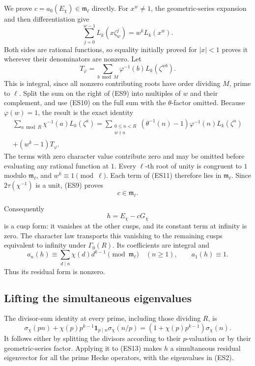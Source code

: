 We prove \(c=a_0(E_\chi)\in\mathfrak m_\ell\) directly.
For \(x^w\ne1\), the geometric-series expansion and then
differentiation give
\[
             \sum_{j=0}^{w-1}L_k(x\zeta_w^j)
                                       =w^kL_k(x^w).
 \tag{ES10}
\]
Both sides are rational functions, so equality initially
proved for \(|x|<1\) proves it wherever their denominators
are nonzero.
Let
\[
          T_\varphi=\sum_{b\bmod M}
                         \varphi^{-1}(b)L_k(\zeta^{wb}).
\]
This is integral, since all nonzero contributing roots have
order dividing \(M\), prime to \(\ell\).
Split the sum on the right of (ES9) into multiples of \(w\)
and their complement, and use (ES10) on the full sum with
the \(\theta\)-factor omitted.
Because \(\varphi(w)=1\), the result is the exact identity
\[
 \begin{split}
 \sum_{a\bmod R}\chi^{-1}(a)L_k(\zeta^a)
  =\sum_{\substack{0\le n<R\\w\nmid n}}
        (\theta^{-1}(n)-1)\varphi^{-1}(n)L_k(\zeta^n)\\
                 +(w^k-1)T_\varphi .
 \end{split}
 \tag{ES11}
\]
The terms with zero character value contribute zero and may
be omitted before evaluating any rational function at \(1\).
Every \(\ell\)-th root of unity is congruent to \(1\) modulo
\(\mathfrak m_\ell\), and \(w^k\equiv1\pmod\ell\).
Each term of (ES11) therefore lies in
\(\mathfrak m_\ell\).
Since \(2\tau(\chi^{-1})\) is a unit, (ES9) proves
\[
                               c\in\mathfrak m_\ell .
 \tag{ES12}
\]

Consequently
\[
                             h=E_\chi-cG_\chi
\]
is a cusp form: it vanishes at the other cusps, and its
constant term at infinity is zero.
The character law transports this vanishing to the remaining
cusps equivalent to infinity under \(\Gamma_0(R)\).
Its coefficients are integral and
\[
 a_n(h)\equiv\sum_{d\mid n}\chi(d)d^{k-1}
                    \pmod{\mathfrak m_\ell}\quad(n\ge1),
                   \qquad a_1(h)\equiv1 .
 \tag{ES13}
\]
Thus its residual form is nonzero.

\subsection{Lifting the simultaneous eigenvalues}
The divisor-sum identity at every prime, including those
dividing \(R\), is
\[
 \sigma_\chi(pn)+\chi(p)p^{k-1}
       {\boldsymbol1}_{p\mid n}\sigma_\chi(n/p)
        =(1+\chi(p)p^{k-1})\sigma_\chi(n).
\]
It follows either by splitting the divisors according to
their \(p\)-valuation or by their geometric-series factor.
Applying it to (ES13) makes \(h\) a simultaneous residual
eigenvector for all the prime Hecke operators, with the
eigenvalues in (ES2).

